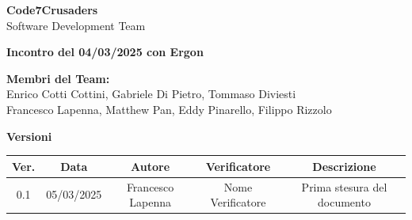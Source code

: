 \documentclass{article}
\begin{document}
\begin{titlepage}
    {\Huge \textbf{Code7Crusaders}}\\
    \vspace{0.5cm}
    {\Large Software Development Team}\\
    \vspace{2cm}
    
    {\large \textbf{Incontro del 04/03/2025 con Ergon}}\\ %
    \vspace{5cm}                           %
    
    
    \textbf{Membri del Team:}\\
    Enrico Cotti Cottini, Gabriele Di Pietro, Tommaso Diviesti \\
    Francesco Lapenna, Matthew Pan, Eddy Pinarello, Filippo Rizzolo \\
    \vspace{0.5cm}
    
    \vspace{1cm}
\end{titlepage}



\newpage
\begin{table}[h!]
\centering
\textbf{Versioni} \\ %
\vspace{2mm} %
\begin{tabular}{|c|c|c|c|c|}
    \hline
    \textbf{Ver.} & \textbf{Data} & \textbf{Autore} & \textbf{Verificatore} & \textbf{Descrizione} \\
    \hline
    0.1 & 05/03/2025 & Francesco Lapenna & Nome Verificatore & Prima stesura del documento \\ 
    \hline                                  %
\end{tabular}
\end{table}



\newpage
\tableofcontents
\end{document}

